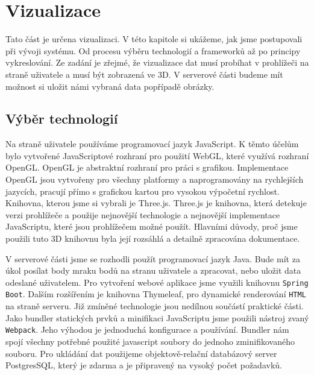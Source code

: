 \documentclass[czech,bachelor,dept420,male,cpdeclaration]{diploma}
\begin{document}
\section{Vizualizace}
Tato část je určena vizualizaci. V této kapitole si ukážeme, jak jsme postupovali při vývoji systému. Od procesu výběru technologií a frameworků až po principy vykreslování. Ze zadání je zřejmé, že vizualizace dat musí probíhat v prohlížeči na straně uživatele a musí být zobrazená ve 3D. V serverové části budeme mít možnost si uložit námi vybraná data popřípadě obrázky. 
\subsection{Výběr technologií}
Na straně uživatele používáme programovací jazyk JavaScript. K těmto účelům bylo vytvořené JavaScriptové rozhraní pro použití WebGL, které využívá rozhraní OpenGL. OpenGL je abstraktní rozhraní pro práci s grafikou. Implementace OpenGL jsou vytvořeny pro všechny platformy a naprogramovány na rychlejších jazycích, pracují přímo s grafickou kartou pro vysokou výpočetní rychlost. Knihovna, kterou jsme si vybrali je Three.js. Three.js je knihovna, která detekuje verzi prohlížeče a použije nejnovější technologie a nejnovější implementace JavaScriptu, které jsou prohlížečem možné použít. Hlavními důvody, proč jsme použili tuto 3D knihovnu byla její rozsáhlá a detailně zpracována dokumentace. 


V serverové části jsme se rozhodli použít programovací jazyk Java. Bude mít za úkol posílat body mraku bodů na stranu uživatele a zpracovat, nebo uložit data odeslané uživatelem. Pro vytvoření webové aplikace jsme využili knihovnu \texttt{Spring Boot}. Dalším rozšířením je knihovna Thymeleaf, pro dynamické renderování \texttt{HTML} na straně serveru. Již zmíněné technologie jsou nedílnou součástí praktické části. 
Jako bundler statických prvků a minifikaci JavaScriptu jsme použili nástroj zvaný \texttt{Webpack}. Jeho výhodou je jednoduchá konfigurace a používání.
Bundler nám spojí všechny potřebné použité javascript soubory do jednoho zminifikovaného souboru.
Pro ukládání dat použijeme objektově-relační databázový server PostgresSQL, který je zdarma a je připravený na vysoký počet požadavků.
\end{document}
